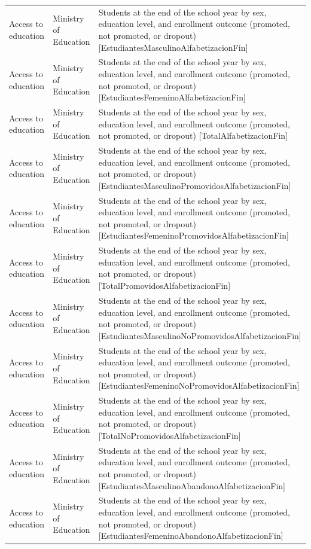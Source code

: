 \documentclass[10pt,a4paper]{article}
\begin{document}
\begin{longtable}{@{}>{\raggedright\arraybackslash}p{3.5cm}>{\raggedright\arraybackslash}p{5.6cm}>{\raggedright\arraybackslash}p{\dimexpr\textwidth-9.1cm-4\tabcolsep\relax}@{}}
Access to education & Ministry of Education & Students at the end of the school year by sex, education level, and enrollment outcome (promoted, not promoted, or dropout) [EstudiantesMasculinoAlfabetizacionFin]\\
Access to education & Ministry of Education & Students at the end of the school year by sex, education level, and enrollment outcome (promoted, not promoted, or dropout) [EstudiantesFemeninoAlfabetizacionFin]\\
Access to education & Ministry of Education & Students at the end of the school year by sex, education level, and enrollment outcome (promoted, not promoted, or dropout) [TotalAlfabetizacionFin]\\
Access to education & Ministry of Education & Students at the end of the school year by sex, education level, and enrollment outcome (promoted, not promoted, or dropout) [EstudiantesMasculinoPromovidosAlfabetizacionFin]\\
Access to education & Ministry of Education & Students at the end of the school year by sex, education level, and enrollment outcome (promoted, not promoted, or dropout) [EstudiantesFemeninoPromovidosAlfabetizacionFin]\\
Access to education & Ministry of Education & Students at the end of the school year by sex, education level, and enrollment outcome (promoted, not promoted, or dropout) [TotalPromovidosAlfabetizacionFin]\\
Access to education & Ministry of Education & Students at the end of the school year by sex, education level, and enrollment outcome (promoted, not promoted, or dropout) [EstudiantesMasculinoNoPromovidosAlfabetizacionFin]\\
Access to education & Ministry of Education & Students at the end of the school year by sex, education level, and enrollment outcome (promoted, not promoted, or dropout) [EstudiantesFemeninoNoPromovidosAlfabetizacionFin]\\
Access to education & Ministry of Education & Students at the end of the school year by sex, education level, and enrollment outcome (promoted, not promoted, or dropout) [TotalNoPromovidosAlfabetizacionFin]\\
Access to education & Ministry of Education & Students at the end of the school year by sex, education level, and enrollment outcome (promoted, not promoted, or dropout) [EstudiantesMasculinoAbandonoAlfabetizacionFin]\\
Access to education & Ministry of Education & Students at the end of the school year by sex, education level, and enrollment outcome (promoted, not promoted, or dropout) [EstudiantesFemeninoAbandonoAlfabetizacionFin]\\

\end{longtable}
\end{document}
